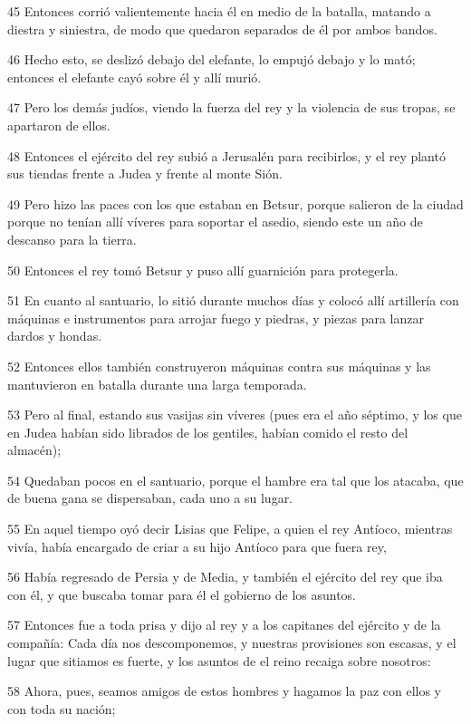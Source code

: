 \par 45 Entonces corrió valientemente hacia él en medio de la batalla, matando a diestra y siniestra, de modo que quedaron separados de él por ambos bandos.
\par 46 Hecho esto, se deslizó debajo del elefante, lo empujó debajo y lo mató; entonces el elefante cayó sobre él y allí murió.
\par 47 Pero los demás judíos, viendo la fuerza del rey y la violencia de sus tropas, se apartaron de ellos.
\par 48 Entonces el ejército del rey subió a Jerusalén para recibirlos, y el rey plantó sus tiendas frente a Judea y frente al monte Sión.
\par 49 Pero hizo las paces con los que estaban en Betsur, porque salieron de la ciudad porque no tenían allí víveres para soportar el asedio, siendo este un año de descanso para la tierra.
\par 50 Entonces el rey tomó Betsur y puso allí guarnición para protegerla.
\par 51 En cuanto al santuario, lo sitió durante muchos días y colocó allí artillería con máquinas e instrumentos para arrojar fuego y piedras, y piezas para lanzar dardos y hondas.
\par 52 Entonces ellos también construyeron máquinas contra sus máquinas y las mantuvieron en batalla durante una larga temporada.
\par 53 Pero al final, estando sus vasijas sin víveres (pues era el año séptimo, y los que en Judea habían sido librados de los gentiles, habían comido el resto del almacén);
\par 54 Quedaban pocos en el santuario, porque el hambre era tal que los atacaba, que de buena gana se dispersaban, cada uno a su lugar.
\par 55 En aquel tiempo oyó decir Lisias que Felipe, a quien el rey Antíoco, mientras vivía, había encargado de criar a su hijo Antíoco para que fuera rey,
\par 56 Había regresado de Persia y de Media, y también el ejército del rey que iba con él, y que buscaba tomar para él el gobierno de los asuntos.
\par 57 Entonces fue a toda prisa y dijo al rey y a los capitanes del ejército y de la compañía: Cada día nos descomponemos, y nuestras provisiones son escasas, y el lugar que sitiamos es fuerte, y los asuntos de el reino recaiga sobre nosotros:
\par 58 Ahora, pues, seamos amigos de estos hombres y hagamos la paz con ellos y con toda su nación;
